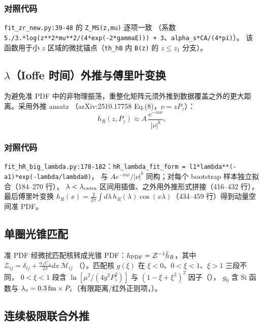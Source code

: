 \documentclass[UTF8]{ctexart}
\begin{document}
\subsubsection*{对照代码}
\texttt{fit\_zr\_new.py:39-48} 的 \texttt{Z\_MS(z,mu)} 逐项一致
（系数 \texttt{5./3.*log(z**2*mu**2/(4*exp(-2*gammaE))) + 3}、\texttt{alpha\_s*CA/(4*pi)}）。
该函数用于小 $z$ 区域的微扰锚点（\texttt{th\_hB} 内 \texttt{B(z)} 的 $z\le z_1$ 分支）。

\subsection{$\lambda$（Ioffe 时间）外推与傅里叶变换}

为避免准 PDF 中的非物理振荡，重整化矩阵元须外推到数据覆盖之外的更大距离。采用外推 ansatz
（arXiv:2510.17758 Eq.(8)，$\nu = z P_z$）：
\begin{equation}
  h_R(z,P_z) \approx A\,\frac{e^{-m\nu}}{|\nu|^b},
\end{equation}
\subsubsection*{对照代码}
\texttt{fit\_hR\_big\_lambda.py:178-182}：\texttt{hR\_lambda\_fit\_form = l1*lambda**(-a1)*exp(-lambda/lambda0)}，
与 $A e^{-m\nu}/|\nu|^b$ 同构；对每个 bootstrap 样本独立拟合（184--270 行），
$\lambda<\lambda_{\rm extra}$ 区间用插值、之外用外推形式拼接（416--432 行），
最后傅里叶变换 $h_R(x) = \frac{2}{2\pi}\int\! d\lambda\, h_R(\lambda)\cos(x\lambda)$（434--459 行）得到动量空间准 PDF。

\subsection{单圈光锥匹配}

准 PDF 经微扰匹配核转成光锥 PDF：$h_{\rm PDF} = \mathcal Z^{-1} \tilde h_R$，其中
$\mathcal Z_{ij} = \delta_{ij} + \frac{\alpha_s C_A}{2\pi} dx\, \mathcal M_{ij}$
（\texttt{}）。匹配核 $g(\xi)$ 在 $\xi<0$、$0<\xi<1$、$\xi>1$ 三段不同，
$0<\xi<1$ 段含 $\ln[\mu^2/(4y^2P_z^2)]$ 与 $(1-\xi+\xi^2)^2$ 因子（\texttt{}），
$g_0$ 含 $\mathrm{Si}$ 函数与 $\lambda_s = 0.3\,{\rm fm}\times P_z$（有限距离/红外正则项，\texttt{}）。

\subsection{连续极限联合外推}
\end{document}

